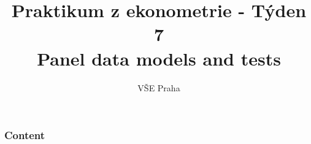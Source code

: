\documentclass{beamer}
\title[Panel data models]{Praktikum z ekonometrie - Týden 7 \\Panel data models and tests} %
\author{VŠE Praha} %
\institute[4EK417] %
{
\medskip
\textit{Tomáš Formánek} %
}
\date{} %
\begin{document}
\begin{frame}
\titlepage %
\end{frame}

\begin{frame}
\frametitle{Content} %
\tableofcontents %
\end{frame}

\end{document}
